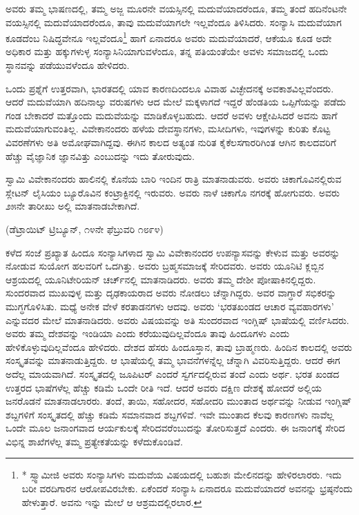 ಅವರು ತಮ್ಮ ಭಾಷಣದಲ್ಲಿ, ತಮ್ಮ ಅಜ್ಜ ಮೂರನೇ ವಯಸ್ಸಿನಲ್ಲಿ ಮದುವೆಯಾದ\break ರೆಂದೂ, ತಮ್ಮ ತಂದೆ ಹದಿನೆಂಟನೇ ವಯಸ್ಸಿನಲ್ಲಿ ಮದುವೆಯಾದರೆಂದೂ, ತಾವು ಮದುವೆಯಾಗಲೇ ಇಲ್ಲವೆಂದೂ ತಿಳಿಸಿದರು. ಸಂನ್ಯಾಸಿ ಮದುವೆಯಾಗ ಕೂಡದೆಂಬ ನಿಷಿದ್ಧವೇನೂ ಇಲ್ಲವೆಂದೂ\footnote{* ಸ್ಸ್ವಾಮೀಜಿ ಅವರು ಸಂನ್ಯಾಸಿಗಳು ಮದುವೆಯ ವಿಷಯದಲ್ಲಿ ಬಹುಶಃ ಮೇಲಿನದನ್ನು ಹೇಳಿರಲಾರರು. ಇದು ಬರೀ ವರದಿಗಾರನ ಆರೋಪವಿರಬೇಕು. ಏಕೆಂದರೆ ಸಂನ್ಯಾಸಿ ಏನಾದರೂ ಮದುವೆಯಾದರೆ ಅವನನ್ನು ಭ್ರಷ್ಠನೆಂದು ಹೇಳುತ್ತಾರೆ. ಅವನು ಇನ್ನು ಮೇಲೆ ಆ ಆಶ್ರಮದಲ್ಲಿರಲಾರ.} ಹಾಗೆ ಏನಾದರೂ ಅವರು ಮದುವೆಯಾದರೆ, ಆಕೆಯೂ ಕೂಡ ಅದೇ ಅಧಿಕಾರ ಮತ್ತು ಹಕ್ಕುಗಳುಳ್ಳ ಸಂನ್ಯಾಸಿನಿಯಾಗುವಳೆಂದೂ, ತನ್ನ ಪತಿ\break ಯಂತೆಯೇ ಅವಳು ಸಮಾಜದಲ್ಲಿ ಒಂದು ಸ್ಥಾನವನ್ನು ಪಡೆಯುವಳೆಂದೂ ಹೇಳಿದರು.

ಒಂದು ಪ್ರಶ್ನೆಗೆ ಉತ್ತರವಾಗಿ, ಭಾರತದಲ್ಲಿ ಯಾವ ಕಾರಣದಿಂದಲೂ ವಿವಾಹ ವಿಚ್ಛೇದನಕ್ಕೆ ಅವಕಾಶವಿಲ್ಲವೆಂದರು. ಆದರೆ ಮದುವೆಯಾಗಿ ಹದಿನಾಲ್ಕು ವರುಷಗಳು ಆದ ಮೇಲೆ ಮಕ್ಕಳಾಗದೆ ಇದ್ದರೆ ಹೆಂಡತಿಯ ಒಪ್ಪಿಗೆಯನ್ನು ಪಡೆದು ಗಂಡ ಬೇಕಾದರೆ ಮತ್ತೊಂದು ಮದುವೆಯನ್ನು ಮಾಡಿಕೊಳ್ಳಬಹುದು. ಆದರೆ ಅವಳು ಆಕ್ಷೇಪಿಸಿದರೆ ಅವನು ಹಾಗೆ ಮದುವೆಯಾಗುವಂತಿಲ್ಲ. ವಿವೇಕಾನಂದರು ಹಳೆಯ ದೇವಸ್ಥಾನಗಳು, ಮಸೀದಿಗಳು, ಇವುಗಳನ್ನು ಕುರಿತು ಕೊಟ್ಟ ವಿವರಣೆಗಳು ಅತಿ ಅಮೋಘವಾಗಿದ್ದವು. ಈಗಿನ ಕಾಲದ ಅತ್ಯಂತ ನುರಿತ ಕೈಕೆಲಸಗಾರರಿಗಿಂತ ಆಗಿನ ಕಾಲದವರಿಗೆ ಹೆಚ್ಚು ವೈಜ್ಞಾನಿಕ ಜ್ಞಾನವಿತ್ತು ಎಂಬುದನ್ನು ಇದು ತೋರುವುದು.

ಸ್ವಾಮಿ ವಿವೇಕಾನಂದರು  ಹಾಲಿನಲ್ಲಿ ಕೊನೆಯ ಬಾರಿ ಇಂದಿನ ರಾತ್ರಿ ಮಾತನಾಡುವರು. ಅವರು ಚಿಕಾಗೊವಿನಲ್ಲಿರುವ ಸ್ಲೇಟನ್​ ಲೈಸಿಯಂ ಬ್ಯೂರೊವಿನ ಕಂಟ್ರಾಕ್ಟಿನಲ್ಲಿ ಇರುವರು. ಅವರು ನಾಳೆ ಚಿಕಾಗೊ ನಗರಕ್ಕೆ ಹೋಗುವರು. ಅವರು ೨೫ನೇ ತಾರೀಖು ಅಲ್ಲಿ ಮಾತನಾಡಬೇಕಾಗಿದೆ.

\delimiter

\vskip 3pt

\begin{center}
(ಡೆಟ್ರಾಯಿಟ್​ ಟ್ರಿಬ್ಯೂನ್​, ೧೪ನೇ ಫೆಬ್ರುವರಿ ೧೮೯೪)
\end{center}

ಕಳೆದ ಸಂಜೆ ಪ್ರಖ್ಯಾತ ಹಿಂದೂ ಸಂನ್ಯಾಸಿಗಳಾದ ಸ್ವಾಮಿ ವಿವೇಕಾನಂದರ ಉಪನ್ಯಾಸವನ್ನು ಕೇಳುವ ಮತ್ತು ಅವರನ್ನು ನೋಡುವ ಸುಯೋಗ ಹಲವರಿಗೆ ಒದಗಿತ್ತು. ಅವರು ಬ್ರಹ್ಮಸಮಾಜಕ್ಕೆ ಸೇರಿದವರು. ಅವರು ಯೂನಿಟಿ ಕ್ಲಬ್ಬಿನ ಆಶ್ರಯದಲ್ಲಿ ಯೂನಿಟೇರಿಯನ್​ ಚರ್ಚ್​ನಲ್ಲಿ ಮಾತನಾಡಿದರು. ಅವರು ತಮ್ಮ ದೇಶೀ ಪೋಷಾಕಿನಲ್ಲಿದ್ದರು. ಸುಂದರವಾದ ಮುಖವುಳ್ಳ ಮತ್ತು ದೃಢಕಾಯರಾದ ಅವರು ನೋಡಲು ಚೆನ್ನಾಗಿದ್ದರು. ಅವರ ವಾಗ್ಧಾರೆ ಸಭಿಕರನ್ನು ಮುಗ್ಧಗೊಳಿಸಿತು. ಮಧ್ಯೆ ಅನೇಕ ವೇಳೆ ಕರತಾಡನಗಳು ಆದವು. ಅವರು ‘ಭರತಖಂಡದ ಆಚಾರ ವ್ಯವಹಾರಗಳು’ ಎನ್ನುವದರ ಮೇಲೆ ಮಾತನಾಡಿದರು. ಅವರು ವಿಷಯವನ್ನು ಅತಿ ಸುಂದರವಾದ ಇಂಗ್ಲಿಷ್​ ಭಾಷೆಯಲ್ಲಿ ವರ್ಣಿಸಿದರು. ಅವರು ತಮ್ಮ ದೇಶವನ್ನು ಇಂಡಿಯಾ ಎಂದು ಕರೆಯುವುದಿಲ್ಲವೆಂದೂ ತಾವು ಹಿಂದೂಗಳು ಎಂದು ಹೇಳಿಕೊಳ್ಳುವುದಿಲ್ಲವೆಂದೂ ಹೇಳಿದರು. ದೇಶದ ಹೆಸರು ಹಿಂದೂಸ್ತಾನ, ತಾವು ಬ್ರಾಹ್ಮಣರು. ಹಿಂದಿನ ಕಾಲದಲ್ಲಿ ಅವರು ಸಂಸ್ಕೃತವನ್ನು ಮಾತನಾಡುತ್ತಿದ್ದರು. ಆ ಭಾಷೆಯಲ್ಲಿ ತಮ್ಮ ಭಾವನೆಗಳನ್ನೆಲ್ಲ ಚೆನ್ನಾಗಿ ವಿವರಿಸುತ್ತಿದ್ದರು. ಆದರೆ ಈಗ ಅದೆಲ್ಲ ಮಾಯವಾಗಿದೆ. ಸಂಸ್ಕೃತದಲ್ಲಿ ಜೂಪಿಟರ್​ ಎಂದರೆ ಸ್ವರ್ಗದಲ್ಲಿರುವ ತಂದೆ ಎಂದು ಅರ್ಥ. ಭರತ ಖಂಡದ ಉತ್ತರದ ಭಾಷೆಗಳೆಲ್ಲ ಹೆಚ್ಚು ಕಡಿಮೆ ಒಂದೇ ರೀತಿ ಇದೆ. ಆದರೆ ಅವರು ದಕ್ಷಿಣ ದೇಶಕ್ಕೆ ಹೋದರೆ ಅಲ್ಲಿಯ ಜನರೊಡನೆ ಮಾತನಾಡಲಾರರು. ತಂದೆ, ತಾಯಿ, ಸಹೋದರ, ಸಹೋದರಿ ಮುಂತಾದ ಅರ್ಥವನ್ನು ನೀಡುವ ಇಂಗ್ಲಿಷ್​ ಶಬ್ದಗಳಿಗೆ ಸಂಸ್ಕೃತದಲ್ಲಿ ಹೆಚ್ಚು ಕಡಿಮೆ ಸಮಾನವಾದ ಶಬ್ದಗಳಿವೆ. ಇವೇ ಮುಂತಾದ ಕೆಲವು ಕಾರಣಗಳು ನಾವೆಲ್ಲ ಒಂದೇ ಮೂಲ ಜನಾಂಗವಾದ ಆರ್ಯಕುಲಕ್ಕೆ ಸೇರಿದವರೆಂಬುದನ್ನು ತೋರಿಸುತ್ತದೆ ಎಂದರು. ಈ ಜನಾಂಗಕ್ಕೆ ಸೇರಿದ ವಿಭಿನ್ನ ಶಾಖೆಗಳೆಲ್ಲ ತಮ್ಮ ಪ್ರತ್ಯೇಕತೆಯನ್ನು ಕಳೆದುಕೊಂಡಿವೆ.

